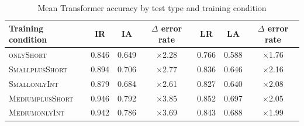 \documentclass[twoside,11pt]{article}
\newcommand{\tscx}[1]{\textsc{#1}\xspace}
\newcommand{\sm}{\tscx{Small}}
\newcommand{\med}{\tscx{Medium}}
\newcommand{\origRand}{IR\xspace}
\newcommand{\longRand}{LR\xspace}
\newcommand{\origAdv}{IA\xspace}
\newcommand{\longAdv}{LA\xspace}
\newcommand{\onlyShort}{\tscx{onlyShort}}
\newcommand{\plusShort}{\tscx{plusShort}}
\newcommand{\onlyInt}{\tscx{onlyInt}}
\begin{document}

\begin{table}[h!]
	\centering
	\begin{tabular}{lcccccc}
		\toprule
		Training condition & \origRand & \origAdv & $\Delta$ error rate & \longRand & \longAdv & $\Delta$ error rate \\
		\midrule                                                
		\onlyShort         & 0.846    & 0.649    & $\times$2.28   & 0.766    & 0.588    & $\times$1.76   \\
		\sm \plusShort     & 0.894    & 0.706    & $\times$2.77   & 0.836    & 0.646    & $\times$2.16   \\
		\sm \onlyInt       & 0.879    & 0.684    & $\times$2.61   & 0.827    & 0.640    & $\times$2.08   \\
		\med \plusShort    & 0.946    & 0.792    & $\times$3.85   & 0.852    & 0.697    & $\times$2.05   \\
		\med \onlyInt      & 0.942    & 0.786    & $\times$3.69   & 0.843    & 0.688    & $\times$1.99   \\
		\bottomrule
	\end{tabular}
	\caption{Mean Transformer accuracy by test type and training condition}
	\label{tab:trans-acc-test-set-by-train}
\end{table}
\end{document}
